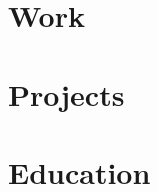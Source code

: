 \documentclass[12pt, a4paper, sans]{moderncv}
\begin{document}
\maketitle

\section{Work}

    

\section{Projects}

    

\section{Education}

    

\pagebreak
\end{document}
